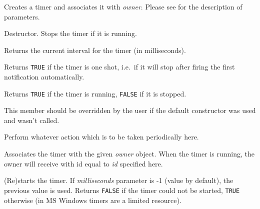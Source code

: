 Creates a timer and associates it with {\it owner}. Please see 
 for the description of parameters.



Destructor. Stops the timer if it is running.



Returns the current interval for the timer (in milliseconds).

\label{wxtimerisoneshot}


Returns {\tt TRUE} if the timer is one shot, i.e.\ if it will stop after firing the
first notification automatically.

\label{wxtimerisrunning}


Returns {\tt TRUE} if the timer is running, {\tt FALSE} if it is stopped.

\label{wxtimernotify}


This member should be overridden by the user if the default constructor was
used and  wasn't called.

Perform whatever action which is to be taken periodically here.

\label{wxtimersetowner}


Associates the timer with the given {\it owner}\/ object. When the timer is
running, the owner will receive  with
id equal to {\it id}\/ specified here.

\label{wxtimerstart}


(Re)starts the timer. If {\it milliseconds}\/ parameter is -1 (value by default),
the previous value is used. Returns {\tt FALSE} if the timer could not be started,
{\tt TRUE} otherwise (in MS Windows timers are a limited resource).

